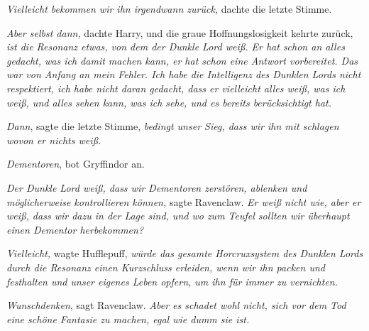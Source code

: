 \emph{Vielleicht bekommen wir ihn irgendwann zurück,} dachte die letzte Stimme.

\emph{Aber selbst dann,} dachte Harry, und die graue Hoffnungslosigkeit kehrte zurück, \emph{ist die Resonanz etwas, von dem der Dunkle Lord weiß. Er hat schon an alles gedacht, was ich damit machen kann, er hat schon eine Antwort vorbereitet. Das war von Anfang an mein Fehler. Ich habe die Intelligenz des Dunklen Lords nicht respektiert, ich habe nicht daran gedacht, dass er vielleicht alles weiß, was ich weiß, und alles sehen kann, was ich sehe, und es bereits berücksichtigt hat.}

\emph{Dann}, sagte die letzte Stimme, \emph{bedingt unser Sieg, dass wir ihn mit schlagen wovon er nichts weiß.}

\emph{Dementoren}, bot Gryffindor an.

\emph{Der Dunkle Lord \emph{weiß}, dass wir Dementoren zerstören, ablenken und möglicherweise kontrollieren können,} sagte Ravenclaw. \emph{Er weiß nicht wie, aber er weiß, dass wir dazu in der Lage sind, und wo zum Teufel sollten wir überhaupt einen Dementor herbekommen?}

\emph{Vielleicht,} wagte Hufflepuff, \emph{würde das gesamte Horcruxsystem des Dunklen Lords durch die Resonanz einen Kurzschluss erleiden, wenn wir ihn packen und festhalten und unser eigenes Leben opfern, um ihn für immer zu vernichten.}

\emph{Wunschdenken}, sagt Ravenclaw. \emph{Aber es schadet wohl nicht, sich vor dem Tod eine schöne Fantasie zu machen, egal wie dumm sie ist.}

